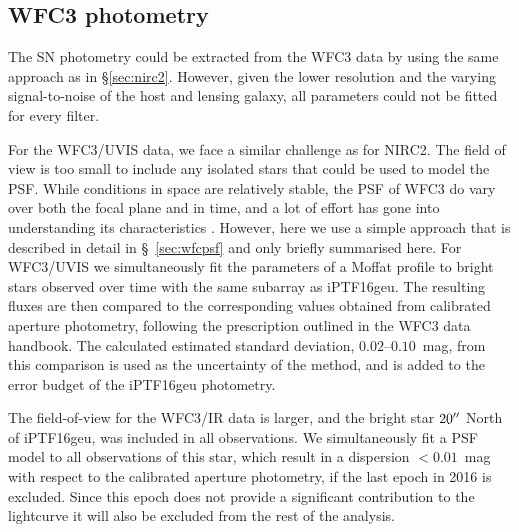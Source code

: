 \documentclass[a4paper,fleqn,usenatbib]{mnras}
\newcommand{\geu}{iPTF16geu\xspace}
\newcommand{\sn}{SN\xspace}
\newcommand{\wfc}{WFC3\xspace}
\newcommand{\wfcuvis}{WFC3/UVIS\xspace}
\newcommand{\wfcir}{WFC3/IR\xspace}
\begin{document}



\subsection{WFC3 photometry}
The \sn photometry could be extracted from the \wfc data by using the same approach as in \S\ref{sec:nirc2}. However, given the 
lower resolution and the varying signal-to-noise of the host and lensing galaxy, all parameters could not be fitted for every filter.

For the \wfcuvis data, we face a similar challenge as for NIRC2.  The field of view is too small to include any isolated stars that 
could be used to model the PSF.  While conditions in space are relatively stable, the PSF of \wfc do vary over both the focal 
plane and in time, and a lot of effort has gone into understanding its characteristics 
\citep{2016wfc..rept...12A,2017arXiv170600386A}.  However, here we use a simple approach that is described in detail 
in \S~\ref{sec:wfcpsf} and only briefly summarised here.  For \wfcuvis we simultaneously fit the parameters of a Moffat profile 
to bright stars observed over time with the same subarray as \geu. The resulting fluxes are then compared to the corresponding 
values obtained from calibrated aperture photometry, following the prescription outlined in the \wfc data handbook.  The calculated 
estimated standard deviation, $0.02$--$0.10$~mag, from this comparison is used as the uncertainty of the method, and is 
added to the error budget of the \geu photometry.

The field-of-view for the \wfcir data is larger, and the bright star $20\hbox{$^{\prime\prime}$}$ North of \geu, was included in all observations.
We simultaneously fit a PSF model to all observations of this star, which result in a dispersion $<0.01$~mag with 
respect to the calibrated aperture photometry, if the last epoch in 2016 is excluded.  Since this epoch does not provide a significant 
contribution to the lightcurve it will also be excluded from the rest of the analysis.
\end{document}
